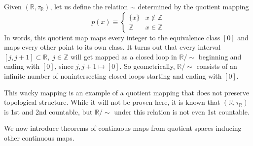 \documentclass{article}
\begin{document}
    \begin{example}
    Given $(\mathbb{R}, \tau_{\mathbb{R}})$, let us define the relation $\sim$ determined by the quotient mapping
    \[p(x) \equiv \begin{cases}
          \{x\} & x \not\in \mathbb{Z} \\
          \mathbb{Z} & x \in \mathbb{Z}
    \end{cases}\]
    In words, this quotient map maps every integer to the equivalence class $[0]$ and maps every other point to its own class. It turns out that every interval $[j, j+1] \subset \mathbb{R}, \; j \in \mathbb{Z}$ will get mapped as a closed loop in $\mathbb{R} / \sim$ beginning and ending with $[0]$, since $j, j+1 \mapsto [0]$. So geometrically, $\mathbb{R} / \sim$ consists of an infinite number of nonintersecting closed loops starting and ending with $[0]$. 
    \begin{center}
    \end{center}

    This wacky mapping is an example of a quotient mapping that does not preserve topological structure. While it will not be proven here, it is known that $(\mathbb{R}, \tau_{\mathbb{R}})$ is 1st and 2nd countable, but $\mathbb{R} / \sim$ under this relation is not even 1st countable. 
    \end{example}

    We now introduce theorems of continuous maps from quotient spaces inducing other continuous maps. 
\end{document}
